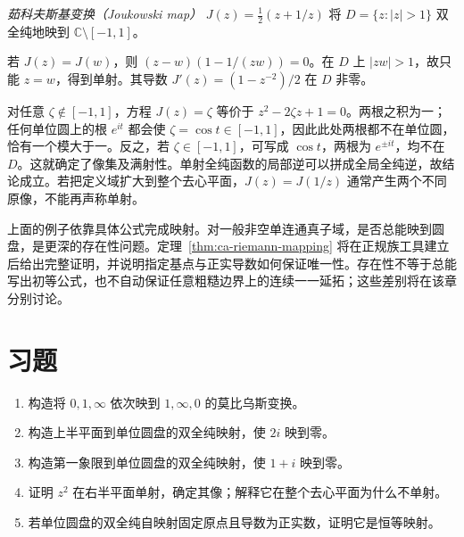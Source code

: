 \begin{example}[茹科夫斯基变换]
\emph{茹科夫斯基变换（Joukowski map）} $J(z)=\tfrac12(z+1/z)$ 将 $D=\{z:|z|>1\}$ 双全纯地映到 $\mathbb C\setminus[-1,1]$。
\end{example}
\begin{solve}
若 $J(z)=J(w)$，则 $(z-w)(1-1/(zw))=0$。在 $D$ 上 $|zw|>1$，故只能 $z=w$，得到单射。其导数 $J'(z)=(1-z^{-2})/2$ 在 $D$ 非零。

对任意 $\zeta\notin[-1,1]$，方程 $J(z)=\zeta$ 等价于 $z^2-2\zeta z+1=0$。两根之积为一；任何单位圆上的根 $e^{it}$ 都会使 $\zeta=\cos t\in[-1,1]$，因此此处两根都不在单位圆，恰有一个模大于一。反之，若 $\zeta\in[-1,1]$，可写成 $\cos t$，两根为 $e^{\pm it}$，均不在 $D$。这就确定了像集及满射性。单射全纯函数的局部逆可以拼成全局全纯逆，故结论成立。若把定义域扩大到整个去心平面，$J(z)=J(1/z)$ 通常产生两个不同原像，不能再声称单射。
\end{solve}

上面的例子依靠具体公式完成映射。对一般非空单连通真子域，是否总能映到圆盘，是更深的存在性问题。定理~\ref{thm:ca-riemann-mapping} 将在正规族工具建立后给出完整证明，并说明指定基点与正实导数如何保证唯一性。存在性不等于总能写出初等公式，也不自动保证任意粗糙边界上的连续一一延拓；这些差别将在该章分别讨论。

\section{习题}
\label{sec:ca-conformal-ex}
\begin{enumerate}
 \item 构造将 $0,1,\infty$ 依次映到 $1,\infty,0$ 的莫比乌斯变换。
 \item 构造上半平面到单位圆盘的双全纯映射，使 $2i$ 映到零。
 \item 构造第一象限到单位圆盘的双全纯映射，使 $1+i$ 映到零。
 \item 证明 $z^2$ 在右半平面单射，确定其像；解释它在整个去心平面为什么不单射。
 \item 若单位圆盘的双全纯自映射固定原点且导数为正实数，证明它是恒等映射。
\end{enumerate}

